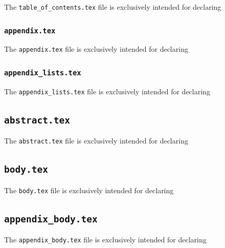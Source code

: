 The \texttt{table\_of\_contents.tex} file is exclusively intended for declaring 

\subsubsection{\texttt{appendix.tex}}
\label{sec:appendix.tex}

The \texttt{appendix.tex} file is exclusively intended for declaring 

\subsubsection{\texttt{appendix\_lists.tex}}
\label{sec:appendix_lists.tex}

The \texttt{appendix\_lists.tex} file is exclusively intended for declaring 

\subsection{\texttt{abstract.tex}}
\label{sec:abstract.tex}

The \texttt{abstract.tex} file is exclusively intended for declaring 

\subsection{\texttt{body.tex}}
\label{sec:body.tex}

The \texttt{body.tex} file is exclusively intended for declaring 

\subsection{\texttt{appendix\_body.tex}}
\label{appendix_body.tex}

The \texttt{appendix\_body.tex} file is exclusively intended for declaring 

